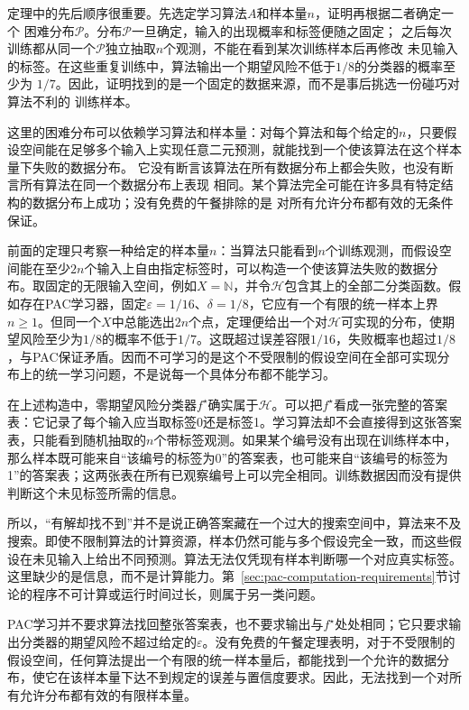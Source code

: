 定理中的先后顺序很重要。先选定学习算法$A$和样本量$n$，证明再根据二者确定一个
困难分布$\mathcal P$。分布$\mathcal P$一旦确定，输入的出现概率和标签便随之固定；
之后每次训练都从同一个$\mathcal P$独立抽取$n$个观测，不能在看到某次训练样本后再修改
未见输入的标签。在这些重复训练中，算法输出一个期望风险不低于$1/8$的分类器的概率至少为
$1/7$。因此，证明找到的是一个固定的数据来源，而不是事后挑选一份碰巧对算法不利的
训练样本。

这里的困难分布可以依赖学习算法和样本量：对每个算法和每个给定的$n$，只要假设空间能在足够多个输入上实现任意二元预测，就能找到一个使该算法在这个样本量下失败的数据分布。
它没有断言该算法在所有数据分布上都会失败，也没有断言所有算法在同一个数据分布上表现
相同。某个算法完全可能在许多具有特定结构的数据分布上成功；没有免费的午餐排除的是
对所有允许分布都有效的无条件保证。

前面的定理只考察一种给定的样本量$n$：当算法只能看到$n$个训练观测，而假设空间能在至少$2n$个输入上自由指定标签时，可以构造一个使该算法失败的数据分布。取固定的无限输入空间，例如$X=\mathbb N$，并令$\mathcal H$包含其上的全部二分类函数。假如存在PAC学习器，固定$\varepsilon=1/16$、$\delta=1/8$，它应有一个有限的统一样本上界$n\geq1$。但同一个$X$中总能选出$2n$个点，定理便给出一个对$\mathcal H$可实现的分布，使期望风险至少为$1/8$的概率不低于$1/7$。这既超过误差容限$1/16$，失败概率也超过$1/8$，与PAC保证矛盾。因而不可学习的是这个不受限制的假设空间在全部可实现分布上的统一学习问题，不是说每一个具体分布都不能学习。

在上述构造中，零期望风险分类器$f^\star$确实属于$\mathcal H$。可以把$f^\star$看成一张完整的答案表：它记录了每个输入应当取标签0还是标签1。学习算法却不会直接得到这张答案表，只能看到随机抽取的$n$个带标签观测。如果某个编号没有出现在训练样本中，那么样本既可能来自“该编号的标签为0”的答案表，也可能来自“该编号的标签为1”的答案表；这两张表在所有已观察编号上可以完全相同。训练数据因而没有提供判断这个未见标签所需的信息。

所以，“有解却找不到”并不是说正确答案藏在一个过大的搜索空间中，算法来不及搜索。即使不限制算法的计算资源，样本仍然可能与多个假设完全一致，而这些假设在未见输入上给出不同预测。算法无法仅凭现有样本判断哪一个对应真实标签。这里缺少的是信息，而不是计算能力。第~\ref{sec:pac-computation-requirements}节讨论的程序不可计算或运行时间过长，则属于另一类问题。

PAC学习并不要求算法找回整张答案表，也不要求输出与$f^\star$处处相同；它只要求输出分类器的期望风险不超过给定的$\varepsilon$。没有免费的午餐定理表明，对于不受限制的假设空间，任何算法提出一个有限的统一样本量后，都能找到一个允许的数据分布，使它在该样本量下达不到规定的误差与置信度要求。因此，无法找到一个对所有允许分布都有效的有限样本量。

